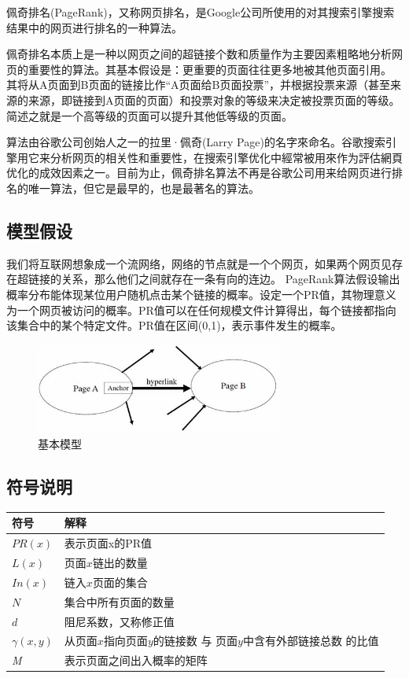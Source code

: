 \documentclass[UTF8
]{ctexart}
\begin{document}
佩奇排名(PageRank)，又称网页排名，是Google公司所使用的对其搜索引擎搜索结果中的网页进行排名的一种算法。

佩奇排名本质上是一种以网页之间的超链接个数和质量作为主要因素粗略地分析网页的重要性的算法。其基本假设是：更重要的页面往往更多地被其他页面引用。
其将从A页面到B页面的链接比作``A页面给B页面投票''，并根据投票来源（甚至来源的来源，即链接到A页面的页面）和投票对象的等级来决定被投票页面的等级。简述之就是一个高等级的页面可以提升其他低等级的页面。

算法由谷歌公司创始人之一的拉里·佩奇(Larry
Page)的名字來命名。谷歌搜索引擎用它来分析网页的相关性和重要性，在搜索引擎优化中經常被用來作为評估網頁优化的成效因素之一。目前为止，佩奇排名算法不再是谷歌公司用来给网页进行排名的唯一算法，但它是最早的，也是最著名的算法。

\hypertarget{header-n16}{%
\subsection{模型假设}\label{header-n16}}
我们将互联网想象成一个流网络，网络的节点就是一个个网页，如果两个网页见存在超链接的关系，那么他们之间就存在一条有向的连边。
PageRank算法假设输出概率分布能体现某位用户随机点击某个链接的概率。设定一个PR值，其物理意义为一个网页被访问的概率。PR值可以在任何规模文件计算得出，每个链接都指向该集合中的某个特定文件。PR值在区间(0,1)，表示事件发生的概率。

\begin{figure}[htbp]
	\centering
	\includegraphics[width=3.2in]{1_1.jpg}
	\caption{基本模型}
	\label{img1}
\end{figure}

\hypertarget{header-n19}{%
\subsection{符号说明}\label{header-n19}}

\begin{longtable}[]{@{}ll@{}}
\toprule
符号 & 解释\tabularnewline
\midrule
\endhead
\(PR(x)\) & 表示页面x的PR值\tabularnewline
\(L(x)\) & 页面\(x\)链出的数量\tabularnewline
\(In(x)\) & 链入\(x\)页面的集合\tabularnewline
\(N\) & 集合中所有页面的数量\tabularnewline
\(d\) & 阻尼系数，又称修正值\tabularnewline
\(\gamma (x,y) \) & 从页面\(x\)指向页面\(y\)的链接数 与
页面\(y\)中含有外部链接总数 的比值\tabularnewline
\emph{M} & 表示页面之间出入概率的矩阵\tabularnewline
\bottomrule
\end{longtable}
\end{document}
